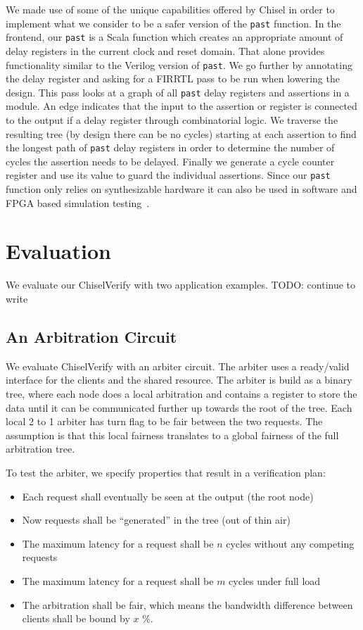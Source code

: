\documentclass[conference]{IEEEtran}
\newcommand{\code}[1]{{\small{\texttt{#1}}}}
\newcommand{\todo}[1]{{\color{olive} TODO: #1}}
\begin{document}
We made use of some of the unique capabilities offered by Chisel in order to implement what we consider to be a safer version of the
\code{past} function.
In the frontend, our \code{past} is a Scala function which creates an appropriate amount of delay registers in the current
clock and reset domain. That alone provides functionality similar to the Verilog version of \code{past}.
We go further by annotating the delay register and asking for a FIRRTL pass to be run when lowering the design.
This pass looks at a graph of all \code{past} delay registers and assertions in a module.
An edge indicates that the input to the assertion or register is connected to the output if a delay register through combinatorial logic.
We traverse the resulting tree (by design there can be no cycles) starting at each assertion
to find the longest path of \code{past} delay registers in order to determine the number of cycles the assertion needs to be delayed.
Finally we generate a cycle counter register and use its value to guard the individual assertions.
Since our \code{past} function only relies on synthesizable hardware it can also be used in software and FPGA based
simulation testing~\cite{karandikar2018firesim}.






\section{Evaluation}

We evaluate our ChiselVerify with two application examples. \todo{continue to write}

\subsection{An Arbitration Circuit}

We evaluate ChiselVerify with an arbiter circuit. The arbiter uses a ready/valid interface for the clients
and the shared resource. The arbiter is build as a binary tree, where each node does a local arbitration
and contains a register to store the data until it can be communicated further up towards the root of the
tree. Each local 2 to 1 arbiter has turn flag to be fair between the two requests. The assumption is that
this local fairness translates to a global fairness of the full arbitration tree.

To test the arbiter, we specify properties that result in a verification plan:

\begin{itemize}
\item Each request shall eventually be seen at the output (the root node)
\item Now requests shall be ``generated'' in the tree (out of thin air)
\item The maximum latency for a request shall be $n$ cycles without any competing requests
\item The maximum latency for a request shall be $m$ cycles under full load
\item The arbitration shall be fair, which means the bandwidth difference between clients shall be bound by $x$ \%.
\end{itemize}
\end{document}
